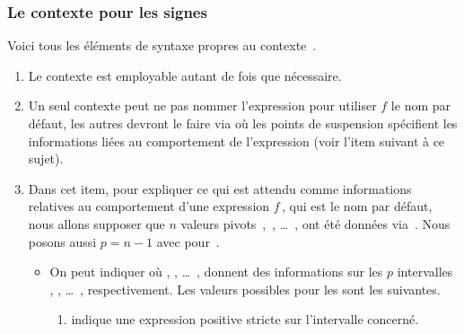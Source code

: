 \documentclass{tutodoc}
\begin{document}

\subsubsection{Le contexte  pour les signes}

Voici tous les éléments de syntaxe propres au contexte \,.
%
\begin{enumerate}
    \item Le contexte  est employable autant de fois que nécessaire.


    \item Un seul contexte  peut ne pas nommer l'expression pour utiliser $f$ le nom par défaut, les autres devront le faire via  où les points de suspension spécifient les informations liées au comportement de l'expression (voir l'item suivant à ce sujet).


    \item Dans cet item, pour expliquer ce qui est attendu comme informations relatives au comportement d'une expression $f$\,, qui est le nom par défaut, nous allons supposer que $n$ valeurs pivots \,, \,, \dots\ ,  ont été données via \,. Nous posons aussi $p = n - 1$ avec  pour \,.
    \begin{itemize}
        \item On peut indiquer
        où
         ,  , \dots\ , 
        donnent des informations sur les $p$ intervalles
        \tdoclatexin{]x1 ; x2[} , \tdoclatexin{]x2 ; x3[} , \dots\ , \tdoclatexin{]xp ; xn[} respectivement.
        Les valeurs possibles pour les  sont les suivantes.
        \begin{enumerate}
            \item \tdoclatexin{+} indique une expression positive stricte sur l'intervalle concerné.


\end{enumerate}
\end{itemize}
\end{enumerate}
\end{document}
